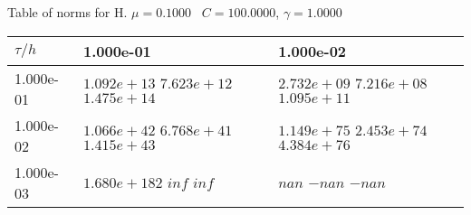 \begin{center}
Table of norms for H. $\mu = 0.1000$ \, $C = 100.0000$, $\gamma = 1.0000$
  
\begin{tabular}{|p{1in}|p{1in}|p{1in}|} \hline
$\tau / h$ &1.000e-01 &1.000e-02 \\ \hline 
1.000e-01 & $1.092e+13$  $7.623e+12$  $1.475e+14$  & $2.732e+09$  $7.216e+08$  $1.095e+11$  \\ \hline 
1.000e-02 & $1.066e+42$  $6.768e+41$  $1.415e+43$  & $1.149e+75$  $2.453e+74$  $4.384e+76$  \\ \hline 
1.000e-03 & $1.680e+182$  $inf$  $inf$  & $nan$  $-nan$  $-nan$  \\ \hline 

\end{tabular}\\[20pt]
\end{center}
